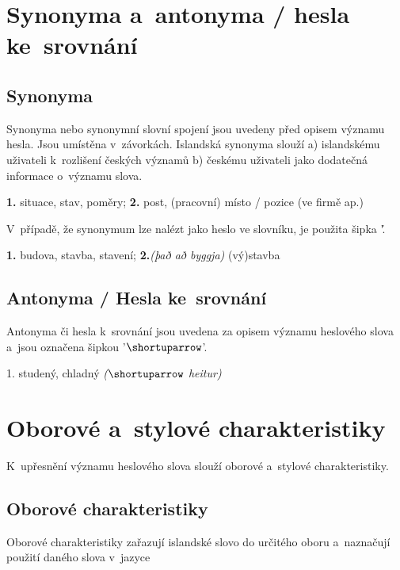 \section{Synonyma a~antonyma / hesla ke~srovnání}
\longsectionskip

\subsection*{Synonyma}

Synonyma nebo synonymní slovní spojení jsou uvedeny před opisem významu hesla. Jsou umístěna v~závorkách. Islandská synonyma slouží a) islandskému uživateli k~rozlišení českých významů b) českému uživateli jako dodatečná informace o~významu slova.

\blspace
  \dicEntry {}   {\textbf{1.}}  {situace, stav, poměry;} {\textbf{2.}}  {post, (pracovní) místo / pozice (ve firmě ap.)}
\blspace

V~případě, že synonymum lze nalézt jako heslo ve slovníku, je použita šipka '\dicsymSee\'.

\blspace
  \dicEntry {} {  {\textbf{1.}}  {budova, stavba, stavení;} {\textbf{2.}}\textit{(það að byggja)} {(vý)stavba} }
\blspace

\subsection*{Antonyma / Hesla ke~srovnání}

Antonyma či hesla k~srovnání jsou uvedena za opisem významu heslového slova a~jsou označena šipkou '$\shortuparrow$'.

\blspace
  \dicEntry {}   {1.} {studený, chladný} \textit{($\shortuparrow$ heitur)}
\blspace

\section{Oborové a~stylové charakteristiky}

K~upřesnění významu heslového slova slouží oborové a~stylové charakteristiky.

\subsection*{Oborové charakteristiky}

Oborové charakteristiky zařazují islandské slovo do určitého oboru a~naznačují použití daného slova v~jazyce

